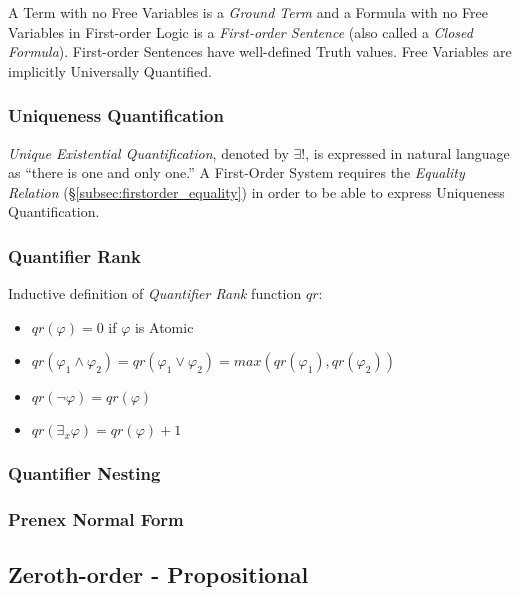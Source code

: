 \documentclass{article}
\begin{document}
A Term with no Free Variables is a \emph{Ground Term} and a Formula
with no Free Variables in First-order Logic is a \emph{First-order
  Sentence} (also called a \emph{Closed Formula}). First-order
Sentences have well-defined Truth values. Free Variables are
implicitly Universally Quantified.

\subsubsection{Uniqueness Quantification}\hfill

\emph{Unique Existential Quantification}, denoted by $\exists !$,
is expressed in natural language as ``there is one and only one.'' A
First-Order System requires the \emph{Equality Relation}
(\S\ref{subsec:firstorder_equality}) in order to be able to express
Uniqueness Quantification.



\subsubsection{Quantifier Rank}

Inductive definition of \emph{Quantifier Rank} function $qr$:
\begin{itemize}
\item $qr(\varphi) = 0$ if $\varphi$ is Atomic
\item $qr(\varphi_1 \wedge \varphi_2) = qr(\varphi_1 \vee \varphi_2) = max(qr(\varphi_1),qr(\varphi_2))$
\item $qr(\neg \varphi) = qr(\varphi)$
\item $qr(\exists_x \varphi) = qr(\varphi) + 1$
\end{itemize}



\subsubsection{Quantifier Nesting}




\subsubsection{Prenex Normal Form}\label{subsec:prenex_normal}



\subsection{Zeroth-order - Propositional}\label{subsec:propositional_logic}
\end{document}
